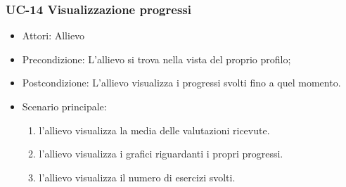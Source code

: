 	\subsubsection{UC-14 Visualizzazione progressi}
	\begin{itemize}
			\item Attori: Allievo
			\item Precondizione: L'allievo si trova nella vista del proprio profilo;
			\item Postcondizione: L'allievo visualizza i progressi svolti fino a quel momento.
			\item Scenario principale:
				\begin{enumerate}
					\item l'allievo visualizza la media delle valutazioni ricevute.
					\item l'allievo visualizza i grafici riguardanti i propri progressi.
					\item l'allievo visualizza il numero di esercizi svolti.
				\end{enumerate}
	\end{itemize}